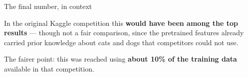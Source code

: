 \documentclass[aspectratio=169,11pt,t]{beamer}
\begin{document}
\begin{frame}{The final number, in context}
{\fontsize{9.4}{12.6}\selectfont\color{fg2}In the original Kaggle competition this \textbf{would have been among the top results} --- though not a fair comparison, since the pretrained features already carried prior knowledge about cats and dogs that competitors could not use.\par}\vskip 4pt
\begin{iband}[signal]
The fairer point: this was reached using \textbf{about 10\% of the training data} available in that competition. 
\end{iband}
\end{frame}
\end{document}
